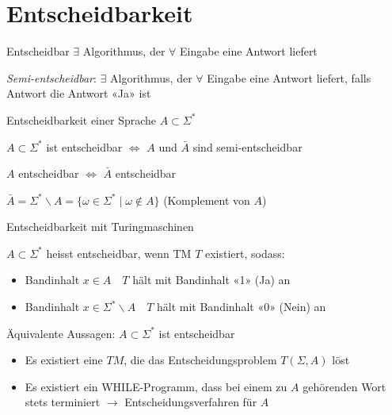 \graphicspath{{images/}}

\section*{Entscheidbarkeit}

\begin{definition}{Entscheidbar} $\exists$ Algorithmus, der $\forall$ Eingabe eine Antwort liefert
        
        \emph{Semi-entscheidbar}: $\exists$ Algorithmus, der $\forall$ Eingabe eine Antwort liefert, falls Antwort die Antwort «Ja» ist
    
\end{definition}

\begin{theorem}{Entscheidbarkeit} einer Sprache $A \subset \Sigma^{*}$

    $A \subset \Sigma^{*}$ ist entscheidbar $\Leftrightarrow$ $A$ und $\bar{A}$ sind semi-entscheidbar

    \vspace{1mm}

    $A$ entscheidbar $\Leftrightarrow$ $\bar{A}$ entscheidbar

    \vspace{1mm}

    {\small $\bar{A}=\Sigma^{*} \backslash A=\{\omega \in \Sigma^{*} \mid \omega \notin A\}$ (Komplement von $A$)}

\end{theorem}

\begin{concept}{Entscheidbarkeit mit Turingmaschinen}

    $A \subset \Sigma^{*}$ heisst entscheidbar, wenn TM $T$ existiert, sodass:
    \begin{itemize}
    \item Bandinhalt $x \in A \quad T$ hält mit Bandinhalt «1» (Ja) an
    \item Bandinhalt $x \in \Sigma^{*} \backslash A \quad T$ hält mit Bandinhalt «0» (Nein) an
    \end{itemize}

    \vspace{1mm}

    {\small
    Äquivalente Aussagen: $A \subset \Sigma^{*}$ ist entscheidbar
    \begin{itemize}
        \item Es existiert eine $T M$, die das Entscheidungsproblem $T(\Sigma, A)$ löst
        \item Es existiert ein WHILE-Programm, dass bei einem zu $A$ gehörenden Wort stets terminiert $\rightarrow$ Entscheidungsverfahren für $A$
    \end{itemize}
    }
\end{concept}

